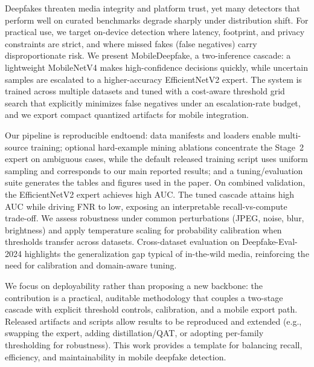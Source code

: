 Deepfakes threaten media integrity and platform trust, yet many detectors that perform well on curated benchmarks degrade sharply under distribution shift. For practical use, we target on\hyp device detection where latency, footprint, and privacy constraints are strict, and where missed fakes (false negatives) carry disproportionate risk. We present MobileDeepfake, a two\hyp inference cascade: a lightweight MobileNetV4 makes high\hyp confidence decisions quickly, while uncertain samples are escalated to a higher\hyp accuracy EfficientNetV2 expert. The system is trained across multiple datasets and tuned with a cost\hyp aware threshold grid search that explicitly minimizes false negatives under an escalation\hyp rate budget, and we export compact quantized artifacts for mobile integration.

Our pipeline is reproducible end\-to\-end: data manifests and loaders enable multi\hyp source training; optional hard\hyp example mining ablations concentrate the Stage~2 expert on ambiguous cases, while the default released training script uses uniform sampling and corresponds to our main reported results; and a tuning/evaluation suite generates the tables and figures used in the paper. On combined validation, the EfficientNetV2 expert achieves high AUC. The tuned cascade attains high AUC while driving FNR to low, exposing an interpretable recall\hyp vs\hyp compute trade\hyp off. We assess robustness under common perturbations (JPEG, noise, blur, brightness) and apply temperature scaling for probability calibration when thresholds transfer across datasets. Cross\hyp dataset evaluation on Deepfake\hyp Eval\hyp 2024 highlights the generalization gap typical of in\hyp the\hyp wild media, reinforcing the need for calibration and domain\hyp aware tuning.

We focus on deployability rather than proposing a new backbone: the contribution is a practical, auditable methodology that couples a two\hyp stage cascade with explicit threshold controls, calibration, and a mobile export path. Released artifacts and scripts allow results to be reproduced and extended (e.g., swapping the expert, adding distillation/QAT, or adopting per\hyp family thresholding for robustness). This work provides a template for balancing recall, efficiency, and maintainability in mobile deepfake detection.
